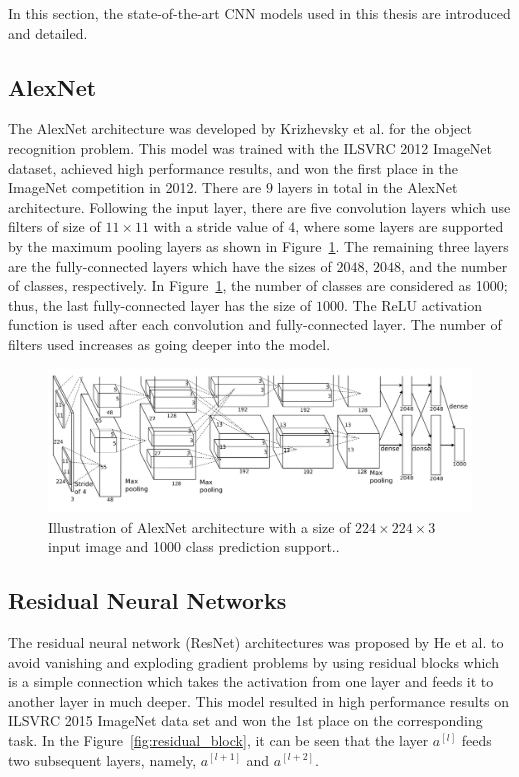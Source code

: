 In this section, the state-of-the-art CNN models used in this thesis are introduced and detailed.

\subsection{AlexNet}

The AlexNet architecture was developed by Krizhevsky et al. \cite{AlexNet} for the object recognition problem. This model was trained with the ILSVRC 2012 ImageNet \cite{imagenet} dataset, achieved high performance results, and won the first place in the ImageNet competition in 2012. There are $9$ layers in total in the AlexNet architecture. Following the input layer, there are five convolution layers which use filters of size of $11 \times 11$ with a stride value of $4$, where some layers are supported by the maximum pooling layers as shown in Figure~\ref{fig:alexnet_arch}. The remaining three layers are the fully-connected layers which have the sizes of $2048$, $2048$, and the number of classes, respectively. In Figure~\ref{fig:alexnet_arch}, the number of classes are considered as 1000; thus, the last fully-connected layer has the size of $1000$.  The ReLU activation function is used after each convolution and fully-connected layer. The number of filters used increases as going deeper into the model.

\begin{figure}[h]
    \centering
    \includegraphics[width=\linewidth]{fig/alexnet_arch.png}
    \caption{Illustration of AlexNet architecture with a size of $224 \times 224 \times 3$ input image and 1000 class prediction support.\cite{AlexNet}.}
    \label{fig:alexnet_arch}
\end{figure}

\subsection{Residual Neural Networks}

The residual neural network (ResNet) architectures was proposed by He et al. \cite{ResNet} to avoid vanishing and exploding gradient problems by using residual blocks which is a simple connection which takes the activation from one layer and feeds it to another layer in much deeper. This model resulted in high performance results on ILSVRC 2015 ImageNet \cite{imagenet} data set and won the 1st place on the corresponding task. In the Figure~\ref{fig:residual_block}, it can be seen that the layer $a^{[l]}$ feeds two subsequent layers, namely, $a^{[l+1]}$ and $a^{[l+2]}$.

